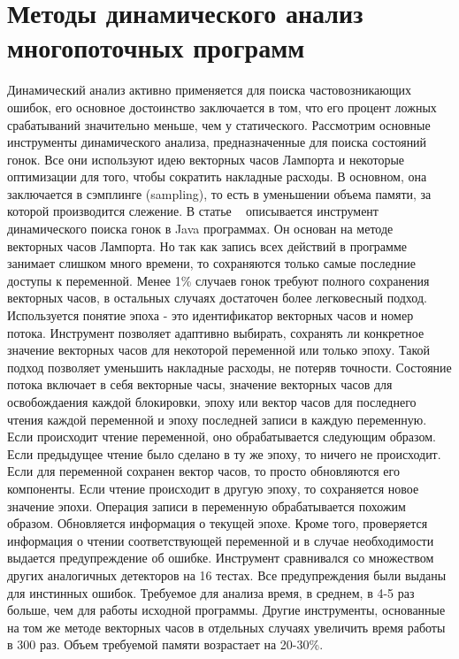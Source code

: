 
\section{Методы динамического анализ многопоточных программ}
\label{rw:dynamic}

Динамический анализ активно применяется для поиска частовозникающих ошибок, его основное достоинство заключается в том, что его процент ложных срабатываний значительно меньше, чем у статического. 
Рассмотрим основные инструменты динамического анализа, предназначенные для поиска состояний гонок. Все они используют идею векторных часов Лампорта и некоторые оптимизации для того, чтобы сократить накладные расходы. В основном, она заключается в сэмплинге (sampling), то есть в уменьшении объема памяти, за которой производится слежение.
В статье ~\cite{Flanagan:2009:PLDI, Flanagan:2009} описывается инструмент динамического поиска гонок в Java программах. Он основан на методе векторных часов Лампорта. Но так как запись всех действий в программе занимает слишком много времени, то сохраняются только самые последние доступы к переменной. Менее 1\% случаев гонок требуют полного сохранения векторных часов, в остальных случаях достаточен более легковесный подход. Используется понятие эпоха - это идентификатор векторных часов и номер потока. Инструмент позволяет адаптивно выбирать, сохранять ли конкретное значение векторных часов для некоторой переменной или только эпоху. Такой подход позволяет уменьшить накладные расходы, не потеряв точности.  
Состояние потока включает в себя векторные часы, значение векторных часов для освобождаения каждой блокировки, эпоху или вектор часов для последнего чтения каждой переменной и эпоху последней записи в каждую переменную. 
Если происходит чтение переменной, оно обрабатывается следующим образом. Если предыдущее чтение было сделано в ту же эпоху, то ничего не происходит. Если для переменной сохранен вектор часов, то просто обновляются его компоненты. Если чтение происходит в другую эпоху, то сохраняется новое значение эпохи. Операция записи в переменную обрабатывается похожим образом. Обновляется информация о текущей эпохе. Кроме того, проверяется информация о чтении соответствующей переменной и в случае необходимости выдается предупреждение об ошибке.
Инструмент сравнивался со множеством других аналогичных детекторов на 16 тестах. Все предупреждения были выданы для инстинных ошибок. Требуемое для анализа время, в среднем, в 4-5 раз больше, чем для работы исходной программы. Другие инструменты, основанные на том же методе векторных часов в отдельных случаях увеличить время работы в 300 раз. Объем требуемой памяти возрастает на 20-30\%.

